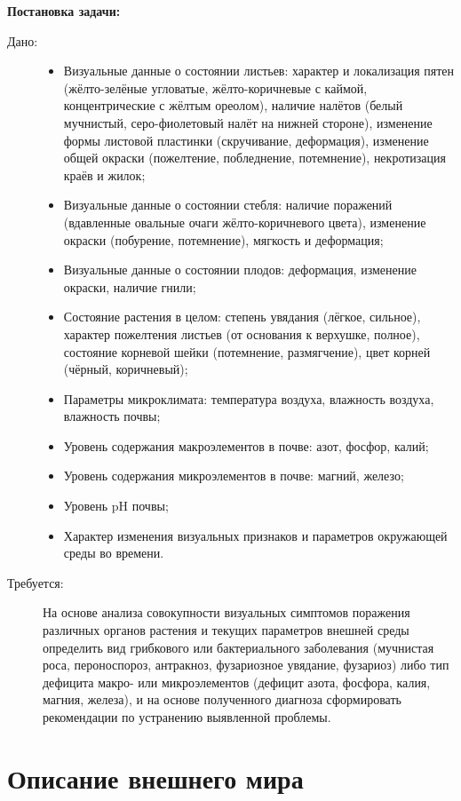 \textbf{Постановка задачи:}
\begin{description}
    \item[Дано:] 
    \begin{itemize}
        \item Визуальные данные о состоянии листьев: характер и локализация пятен (жёлто-зелёные угловатые, жёлто-коричневые с каймой, концентрические с жёлтым ореолом), наличие налётов (белый мучнистый, серо-фиолетовый налёт на нижней стороне), изменение формы листовой пластинки (скручивание, деформация), изменение общей окраски (пожелтение, побледнение, потемнение), некротизация краёв и жилок;
        \item Визуальные данные о состоянии стебля: наличие поражений (вдавленные овальные очаги жёлто-коричневого цвета), изменение окраски (побурение, потемнение), мягкость и деформация;
        \item Визуальные данные о состоянии плодов: деформация, изменение окраски, наличие гнили;
        \item Состояние растения в целом: степень увядания (лёгкое, сильное), характер пожелтения листьев (от основания к верхушке, полное), состояние корневой шейки (потемнение, размягчение), цвет корней (чёрный, коричневый);
        \item Параметры микроклимата: температура воздуха, влажность воздуха, влажность почвы;
        \item Уровень содержания макроэлементов в почве: азот, фосфор, калий;
        \item Уровень содержания микроэлементов в почве: магний, железо;
        \item Уровень pH почвы;
        \item Характер изменения визуальных признаков и параметров окружающей среды во времени.
    \end{itemize}
    \item[Требуется:] На основе анализа совокупности визуальных симптомов поражения различных органов растения и текущих параметров внешней среды определить вид грибкового или бактериального заболевания (мучнистая роса, пероноспороз, антракноз, фузариозное увядание, фузариоз) либо тип дефицита макро- или микроэлементов (дефицит азота, фосфора, калия, магния, железа), и на основе полученного диагноза сформировать рекомендации по устранению выявленной проблемы.
\end{description}

\section{Описание внешнего мира}

